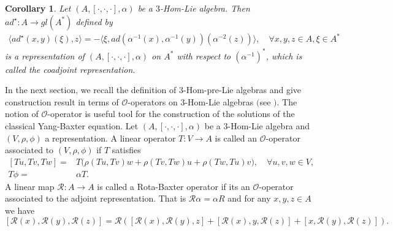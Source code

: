 \documentclass[a4paper,11pt]{article}
\def\a{\alpha}
\def\c{\cdot}
\newtheorem{cor}[thm]{Corollary}
\theoremstyle{definition}
\begin{document}
\begin{cor}
Let $(A,[\c,\c,\c],\a)$ be a $3$-Hom-Lie algebra. Then $ad^\star: A \to gl(A^*)$ defined by
\begin{align}\label{coadjoint rep}
\langle ad^\star(x,y)(\xi),z\rangle=-\langle\xi,ad(\a^{-1}(x),\a^{-1}(y))(\a^{-2}(z))\rangle,\quad\forall x,y,z\in A, \xi \in A^*
\end{align}
is a representation of  $(A,[\c,\c,\c],\a)$ on $A^*$ with respect to $(\a^{-1})^*$, which is called the coadjoint representation.
\end{cor}



In the next section, we recall the definition of $3$-Hom-pre-Lie algebras and give construction result in terms of  {$\mathcal O$-operators}  on $3$-Hom-Lie algebras $($see \cite{Guo&Zhang&Wang}$)$. The notion of $\mathcal{O}$-operator is useful tool for the construction of the solutions of the classical Yang-Baxter equation.
Let $(A,[\cdot,\cdot,\cdot],\alpha)$ be a $3$-Hom-Lie algebra and $(V,\rho,\phi)$
a representation.  A linear operator $T:V\rightarrow A$ is called
an $\mathcal O$-operator associated to $( V,\rho,\phi)$ if $T$
satisfies
\begin{align}\label{eq:Ooperator}
 [Tu,Tv,Tw]=&T\big(\rho(Tu,Tv)w+\rho(Tv,Tw)u+\rho(Tw,Tu)v\big),\quad \forall u,v,w\in V, \\
 T \phi=& \alpha  T.
\end{align}
A linear map $\mathcal R:A\to A$ is called a Rota-Baxter operator if its an $\mathcal O$-operator associated to the adjoint representation. That is $\mathcal R\a=\a R$ and for any $x,y,z\in A$ we have
$$[\mathcal R(x),\mathcal R(y),\mathcal R(z)]=\mathcal R([\mathcal R(x),\mathcal R(y),z]+[\mathcal R(x),y,\mathcal R(z)]+[x,\mathcal R(y),\mathcal R(z)]).$$

\end{document}
